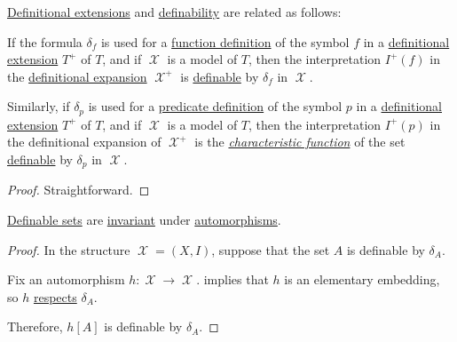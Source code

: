 \begin{proposition}\label{thm:fol_definability_and_definitions}
  \hyperref[def:fol_definitional_extension]{Definitional extensions} and \hyperref[def:fol_definability]{definability} are related as follows:
  \begin{thmenum}
     If the formula \( \delta_f \) is used for a \hyperref[def:fol_definition/function]{function definition} of the symbol \( f \) in a \hyperref[def:fol_definitional_extension]{definitional extension} \( T^+ \) of \( T \), and if \( \mscrX \) is a model of \( T \), then the interpretation \( I^+(f) \) in the \hyperref[def:fol_definitional_structure_expansion]{definitional expansion} \( \mscrX^+ \) is \hyperref[def:fol_definability/function]{definable} by \( \delta_f \) in \( \mscrX \).

     Similarly, if \( \delta_p \) is used for a \hyperref[def:fol_definition/predicate]{predicate definition} of the symbol \( p \) in a \hyperref[def:fol_definitional_extension]{definitional extension} \( T^+ \) of \( T \), and if \( \mscrX \) is a model of \( T \), then the interpretation \( I^+(p) \) in the definitional expansion of \( \mscrX^+ \) is the \hyperref[def:subset_characteristic_function]{\emph{characteristic function}} of the set \hyperref[def:fol_definability/function]{definable} by \( \delta_p \) in \( \mscrX \).
  \end{thmenum}
\end{proposition}
\begin{proof}
  Straightforward.
\end{proof}

\begin{proposition}\label{thm:fol_definable_set_automorphism}
  \hyperref[def:fol_definability]{Definable sets} are \hyperref[def:invariant_subset]{invariant} under \hyperref[def:categorical_endomorphism]{automorphisms}.
\end{proposition}
\begin{proof}
  In the structure \( \mscrX = (X, I) \), suppose that the set \( A \) is definable by \( \delta_A \).

  Fix an automorphism \( h: \mscrX \to \mscrX \).  implies that \( h \) is an elementary embedding, so \( h \) \hyperref[def:fol_function_respect/formula]{respects} \( \delta_A \).

  Therefore, \( h[A] \) is definable by \( \delta_A \).
\end{proof}

